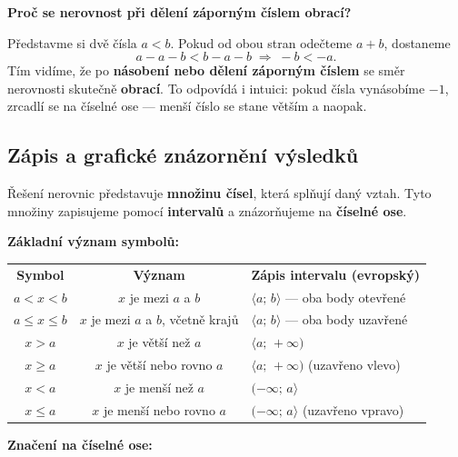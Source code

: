 \documentclass[12pt,a4paper]{article}
\begin{document}
\begin{notebox}
\textbf{Proč se nerovnost při dělení záporným číslem obrací?}

Představme si dvě čísla $a < b$.  
Pokud od obou stran odečteme $a + b$, dostaneme
\[
a - a - b < b - a - b \;\Rightarrow\; -b < -a.
\]
Tím vidíme, že po \textbf{násobení nebo dělení záporným číslem} se směr nerovnosti skutečně \textbf{obrací}.  
To odpovídá i intuici: pokud čísla vynásobíme $-1$, zrcadlí se na číselné ose — menší číslo se stane větším a naopak.
\end{notebox}


\subsection*{Zápis a grafické znázornění výsledků}

Řešení nerovnic představuje \textbf{množinu čísel}, která splňují daný vztah.  
Tyto množiny zapisujeme pomocí \textbf{intervalů} a znázorňujeme na \textbf{číselné ose}.  

\medskip
\noindent
\textbf{Základní význam symbolů:}

\begin{center}
\renewcommand{\arraystretch}{1.4}
\begin{tabular}{ccl}
\textbf{Symbol} & \textbf{Význam} & \textbf{Zápis intervalu (evropský)}\\
$a < x < b$ & $x$ je mezi $a$ a $b$ & $\langle a;\,b\rangle$ — oba body otevřené\\
$a \le x \le b$ & $x$ je mezi $a$ a $b$, včetně krajů & $\langle a;\,b\rangle$ — oba body uzavřené\\
$x > a$ & $x$ je větší než $a$ & $\langle a;\,+\infty)$\\
$x \ge a$ & $x$ je větší nebo rovno $a$ & $\langle a;\,+\infty)$ (uzavřeno vlevo)\\
$x < a$ & $x$ je menší než $a$ & $(-\infty;\,a\rangle$\\
$x \le a$ & $x$ je menší nebo rovno $a$ & $(-\infty;\,a\rangle$ (uzavřeno vpravo)\\
\end{tabular}
\end{center}

\medskip
\noindent
\textbf{Značení na číselné ose:}
\end{document}
